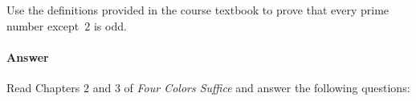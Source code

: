 \documentclass{article}
\begin{document}
 
Use the definitions provided in the course textbook to prove that every prime
number except~$2$ is odd.

\paragraph{Answer}


%
\collab{\todo{}}
Read Chapters $2$ and $3$ of \emph{Four Colors Suffice} and answer the following questions:
\end{document}
